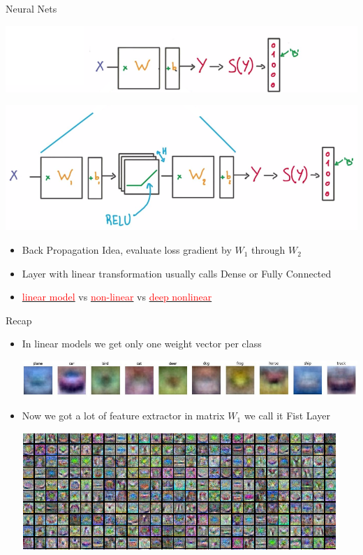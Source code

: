 \documentclass{beamer}
\begin{document}
\begin{frame}{Neural Nets}
			\begin{center}
				  \includegraphics[scale=0.45]{img/nn1}
				
				  \includegraphics[scale=0.45]{img/nn2}
			\end{center}
			\begin{itemize}
				\item    Back Propagation Idea, evaluate loss gradient by $W_1$ through $W_2$ 
				\item    Layer with linear transformation usually calls Dense or Fully Connected
				\item 	
					  \href{https://goo.gl/77q8Xh}{\textcolor{red}{linear model}} vs 
					            \href{https://goo.gl/ziVfWI}{\textcolor{red}{non-linear}} vs 
					            \href{https://goo.gl/aYiGbl}{\textcolor{red}{deep nonlinear}} 
			\end{itemize}

\end{frame}


\begin{frame}{Recap}
	\begin{itemize}
		  \item In linear models we get only one weight vector per class 
		\begin{center}
			  \includegraphics[scale=0.3]{img/w3}
		\end{center}
		\item   Now we got a lot of feature extractor in matrix $W_1$ we call it Fist Layer
		\begin{center}
			  \includegraphics[scale=0.7]{img/w4}
		\end{center}
				
		
	\end{itemize}
\end{frame}
\end{document}
